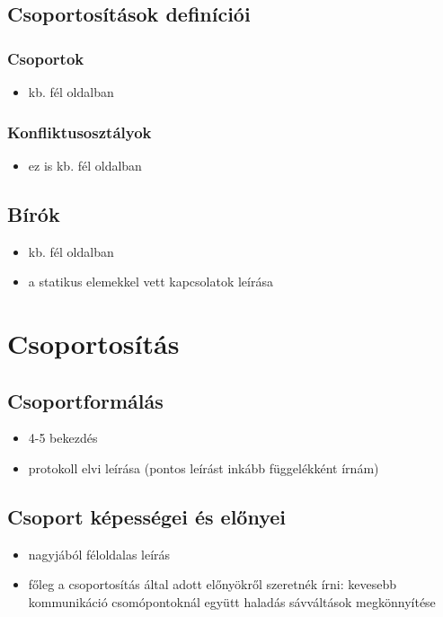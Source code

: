 \documentclass{report}
\begin{document}
			\subsection{Csoportosítások definíciói}
				\subsubsection{Csoportok}
					\begin{itemize}
						\item kb. fél oldalban
					\end{itemize}
				\subsubsection{Konfliktusosztályok}
					\begin{itemize}
						\item ez is kb. fél oldalban
					\end{itemize}
			\subsection{Bírók}
				\begin{itemize}
					\item kb. fél oldalban
					\item a statikus elemekkel vett kapcsolatok leírása
				\end{itemize}
		\section{Csoportosítás}
			\subsection{Csoportformálás}
				\begin{itemize}
					\item 4-5 bekezdés
					\item protokoll elvi leírása (pontos leírást inkább függelékként írnám)
				\end{itemize}
			\subsection{Csoport képességei és előnyei}
				\begin{itemize}
					\item nagyjából féloldalas leírás
					\item főleg a csoportosítás által adott előnyökről szeretnék írni:
						\subitem kevesebb kommunikáció csomópontoknál
						\subitem együtt haladás
						\subitem sávváltások megkönnyítése
				\end{itemize}
\end{document}

